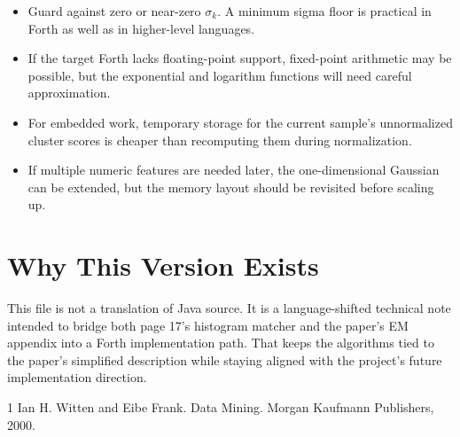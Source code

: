 \documentclass[11pt]{article}
\begin{document}
\begin{itemize}
\item Guard against zero or near-zero $\sigma_k$. A minimum sigma floor is practical in Forth as well as in higher-level languages.
\item If the target Forth lacks floating-point support, fixed-point arithmetic may be possible, but the exponential and logarithm functions will need careful approximation.
\item For embedded work, temporary storage for the current sample's unnormalized cluster scores is cheaper than recomputing them during normalization.
\item If multiple numeric features are needed later, the one-dimensional Gaussian can be extended, but the memory layout should be revisited before scaling up.
\end{itemize}

\section*{Why This Version Exists}

This file is not a translation of Java source. It is a language-shifted technical note intended to bridge both page 17's histogram matcher and the paper's EM appendix into a Forth implementation path. That keeps the algorithms tied to the paper's simplified description while staying aligned with the project's future implementation direction.

\begin{thebibliography}{1}
Ian H. Witten and Eibe Frank.
\newblock Data Mining.
\newblock Morgan Kaufmann Publishers, 2000.
\end{thebibliography}
\end{document}
